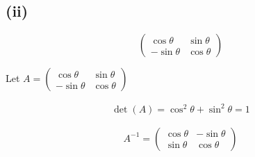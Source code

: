 \subsection*{(ii)}
\[
	\begin{pmatrix}
		\cos\theta  & \sin\theta \\
		-\sin\theta & \cos\theta
	\end{pmatrix}
\]

Let $A = \begin{pmatrix}
		\cos\theta  & \sin\theta \\
		-\sin\theta & \cos\theta
	\end{pmatrix}$

\begin{align}
	\det(A) = \cos^2\theta + \sin^2\theta = 1
\end{align}

\[
	A^{-1} = \begin{pmatrix}
		\cos\theta & -\sin\theta \\
		\sin\theta & \cos\theta
	\end{pmatrix}
\]